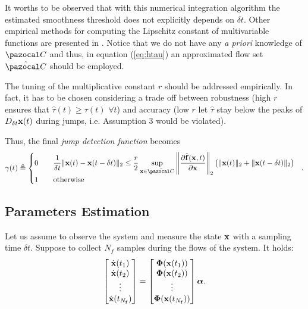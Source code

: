 It worths to be observed that with this numerical integration algorithm the estimated smoothness threshold does not explicitly depends on $\delta t$.
Other empirical methods for computing the Lipschitz constant of multivariable functions are presented in \cite{mladineo1986algorithm,Wood1996}. Notice that we do not have any \textit{a priori} knowledge of $\C$ and thus, in equation (\ref{eq:htau}) an approximated flow set $\hat{\C}$  should be employed.
%
{%
\begin{rem}
    The tuning of the multiplicative constant $r$ should be addressed empirically.
    In fact, it has to be chosen considering a trade off between robustness (high $r$ ensures that $\hat{\tau}(t)\geq\tau(t)$ $\forall t$) and accuracy (low $r$ let $\hat{\tau}$ stay below the peaks of $D_{\delta t}\mathbf{x}(t)$ during jumps, i.e. Assumption 3 would be violated).
\end{rem}
}
%
Thus, the final \textit{jump detection function} becomes
%
\begin{equation}
    \gamma(t)\triangleq \left\{ 
        \begin{matrix*}[l]\vspace{1pt}
            0&&\dfrac{1}{\delta t}\|\x(t)-\x(t-\delta t)\|_2 \leq \dfrac{r}{2}\sup\limits_{\x\in\hat{\C}}\left\|\dfrac{\partial \hat{\mathbf{f}}(\x,t)}{\partial\x}\right\|_2\big(\|\x(t)\|_2+\|\x(t-\delta t)\|_2\big)\\
            1&&\text{otherwise}
        \end{matrix*}
    \right.~~.
\end{equation}
%
\subsection{Parameters Estimation}
Let us assume to observe the system and measure the state $\mathbf{x}$ with a sampling time $\delta t$. Suppose to collect $N_f$ samples during the flows of the system. %
It holds:
%
\begin{equation}\label{eq:linflow}
	\begin{bmatrix}\dot{\mathbf{x}}(t_1)\\\dot{\mathbf{x}}(t_2)\\\vdots\\\dot{\mathbf{x}}(t_{N_\mathbf{f}})\end{bmatrix}=
	\begin{bmatrix}\bm{\Phi}(\mathbf{x}(t_1))\\\bm{\Phi}(\mathbf{x}(t_2))\\\vdots\\\bm{\Phi}(\mathbf{x}(t_{N_\mathbf{f}}))\end{bmatrix}\bm{\alpha}.
\end{equation}
%

